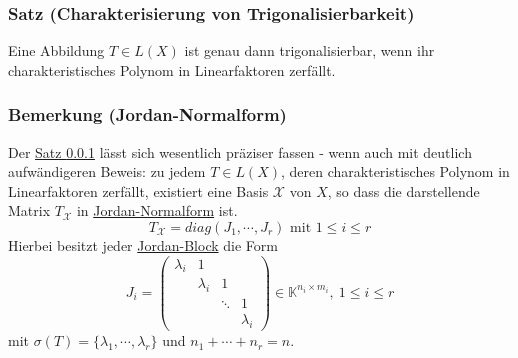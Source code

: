 \subsubsection{Satz (Charakterisierung von Trigonalisierbarkeit)}
\label{4.4.5}
Eine Abbildung $T\in L(X)$ ist genau dann trigonalisierbar, wenn ihr charakteristisches Polynom in Linearfaktoren zerfällt.
\subsubsection{Bemerkung (Jordan-Normalform)}
Der \hyperref[4.4.5]{Satz \ref{4.4.5}} lässt sich wesentlich präziser fassen - wenn auch mit deutlich aufwändigeren Beweis: zu jedem $T\in L(X)$, deren charakteristisches Polynom in Linearfaktoren zerfällt, existiert eine Basis $\mathcal{X}$ von $X$, so dass die darstellende Matrix $T_\mathcal{X}$ in \underline{Jordan-Normalform} ist.
\[T_\mathcal{X}=diag(J_1,\cdots ,J_r)\text{ mit } 1\leq i\leq r\]
Hierbei besitzt jeder \underline{Jordan-Block} die Form 
\[J_i=\begin{pmatrix}\lambda _i & 1\\ & \lambda _i & 1 \\& & \ddots & 1\\ & & & \lambda _i\end{pmatrix}\in\mathbb{K}^{n_i\times m_i},\ 1\leq i\leq r\]
mit $\sigma (T) = \{\lambda _1,\cdots ,\lambda _r\}$ und $n_1+\cdots +n_r=n$.
